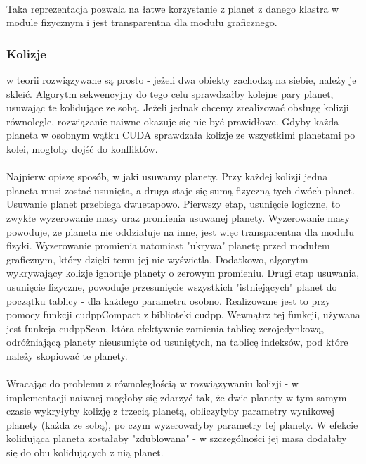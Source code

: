 \paragraph{} Taka reprezentacja pozwala na łatwe korzystanie z planet z danego klastra w module fizycznym i jest transparentna dla modułu graficznego.

\subsubsection{Kolizje} w teorii rozwiązywane są prosto - jeżeli dwa obiekty zachodzą na siebie, należy je skleić. Algorytm sekwencyjny do tego celu sprawdzałby kolejne pary planet, usuwając te kolidujące ze sobą. Jeżeli jednak chcemy zrealizować obsługę kolizji równolegle, rozwiązanie naiwne okazuje się nie być prawidłowe. Gdyby każda planeta w osobnym wątku CUDA sprawdzała kolizje ze wszystkimi planetami po kolei, mogłoby dojść do konfliktów.

\paragraph{} Najpierw opiszę sposób, w jaki usuwamy planety. Przy każdej kolizji jedna planeta musi zostać usunięta, a druga staje się sumą fizyczną tych dwóch planet. Usuwanie planet przebiega dwuetapowo. Pierwszy etap, usunięcie logiczne, to zwykłe wyzerowanie masy oraz promienia usuwanej planety. Wyzerowanie masy powoduje, że planeta nie oddziałuje na inne, jest więc transparentna dla modułu fizyki. Wyzerowanie promienia natomiast "ukrywa" planetę przed modułem graficznym, który dzięki temu jej nie wyświetla. Dodatkowo, algorytm wykrywający kolizje ignoruje planety o zerowym promieniu.
Drugi etap usuwania, usunięcie fizyczne, powoduje przesunięcie wszystkich "istniejących" planet do początku tablicy - dla każdego parametru osobno. Realizowane jest to przy pomocy funkcji cudppCompact z biblioteki cudpp.
Wewnątrz tej funkcji, używana jest funkcja cudppScan, która efektywnie zamienia tablicę zerojedynkową, odróżniającą planety nieusunięte od usuniętych, na tablicę indeksów, pod które należy skopiować te planety.

\paragraph{} Wracając do problemu z równoległością w rozwiązywaniu kolizji - w implementacji naiwnej mogłoby się zdarzyć tak, że dwie planety w tym samym czasie wykryłyby kolizję z trzecią planetą, obliczyłyby parametry wynikowej planety (każda ze sobą), po czym wyzerowałyby parametry tej planety. W efekcie kolidująca planeta zostałaby "zdublowana" - w szczególności jej masa dodałaby się do obu kolidujących z nią planet.


